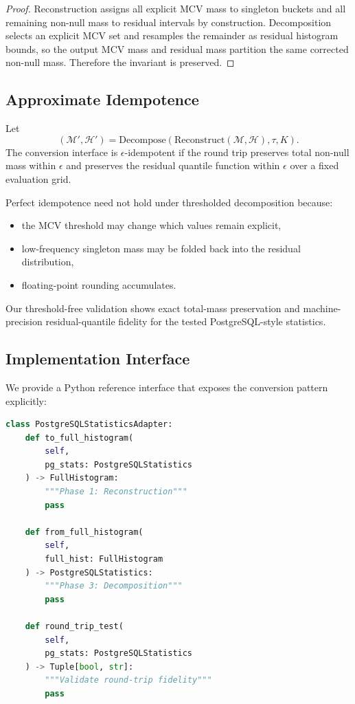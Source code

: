 \begin{proof}
Reconstruction assigns all explicit MCV mass to singleton buckets and all
remaining non-null mass to residual intervals by construction. Decomposition
selects an explicit MCV set and resamples the remainder as residual histogram
bounds, so the output MCV mass and residual mass partition the same corrected
non-null mass. Therefore the invariant is preserved.
\end{proof}

\subsection{Approximate Idempotence}

\begin{definition}
Let
\[
  (\mathcal{M}', \mathcal{H}') = \mathrm{Decompose}(\mathrm{Reconstruct}(\mathcal{M}, \mathcal{H}), \tau, K).
\]
The conversion interface is $\epsilon$-idempotent if the round trip preserves total non-null mass within $\epsilon$ and preserves the residual quantile function within $\epsilon$ over a fixed evaluation grid.
\end{definition}

Perfect idempotence need not hold under thresholded decomposition because:
\begin{itemize}
    \item the MCV threshold may change which values remain explicit,
    \item low-frequency singleton mass may be folded back into the residual distribution,
    \item floating-point rounding accumulates.
\end{itemize}

Our threshold-free validation shows exact total-mass preservation and
machine-precision residual-quantile fidelity for the tested PostgreSQL-style
statistics.

\subsection{Implementation Interface}

We provide a Python reference interface that exposes the conversion pattern
explicitly:

\begin{lstlisting}[language=Python, caption=Statistics-Format Conversion Interface (PostgreSQL Instance)]
class PostgreSQLStatisticsAdapter:
    def to_full_histogram(
        self,
        pg_stats: PostgreSQLStatistics
    ) -> FullHistogram:
        """Phase 1: Reconstruction"""
        pass

    def from_full_histogram(
        self,
        full_hist: FullHistogram
    ) -> PostgreSQLStatistics:
        """Phase 3: Decomposition"""
        pass

    def round_trip_test(
        self,
        pg_stats: PostgreSQLStatistics
    ) -> Tuple[bool, str]:
        """Validate round-trip fidelity"""
        pass
\end{lstlisting}

